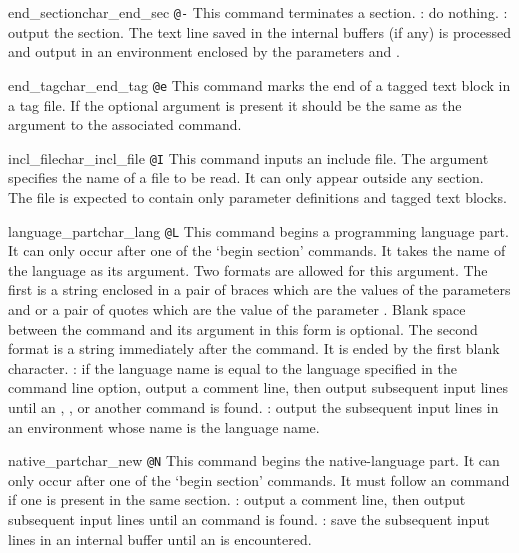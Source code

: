 \begin{describecmd}{end_section}{char_end_sec}{\none}
{\verb|@-|}
\describe
This command terminates a section.
\tangleaction: do nothing.
\weaveaction: output the section. The text line saved in the
internal buffers (if any) is processed and output in an environment
enclosed by the parameters  and .
\end{describecmd}

\begin{describecmd}{end_tag}{char_end_tag}{\opt}
{\verb|@e|}
\describe
This command marks the end of a tagged text block in a tag file.
If the optional argument is present it should be the same as the
argument to the associated  command.
\end{describecmd}

\begin{describecmd}{incl_file}{char_incl_file}{\man}
{\verb|@I|}
\describe
This command inputs an include file. The argument specifies the name
of a file to be read. It can only appear outside any section. The file
is expected to contain only parameter definitions and tagged text
blocks. 
\end{describecmd}

\begin{describecmd}{language_part}{char_lang}{\man}
{\verb|@L|}
\describe
This command begins a programming language part. It can only occur
after one of the `begin section' commands. It takes the name of the
language as its argument. Two formats are allowed for this argument.
The first is a string enclosed in a pair of braces which are the
values of the parameters  and
 or a pair of quotes which are the value of the
parameter . Blank space between the command and
its argument in this form is optional. The second format is a string
immediately after the command. It is ended by the first blank
character.
\tangleaction: if the language name is equal to the language specified
in the command line option, output a comment line, then output
subsequent input lines until an , ,
 or another  command is found.
\weaveaction: output the subsequent input lines in an environment
whose name is the language name.
\end{describecmd}

\begin{describecmd}{native_part}{char_new}{\none}
{\verb|@N|}
\describe
This command begins the native-language part. It can only occur after
one of the `begin section' commands. It must follow an
 command if one is present in the same section.
\tangleaction: output a comment line, then output subsequent input
lines until an  command is found.
\weaveaction: save the subsequent input lines in an internal buffer
 until an  is encountered.
\end{describecmd}

